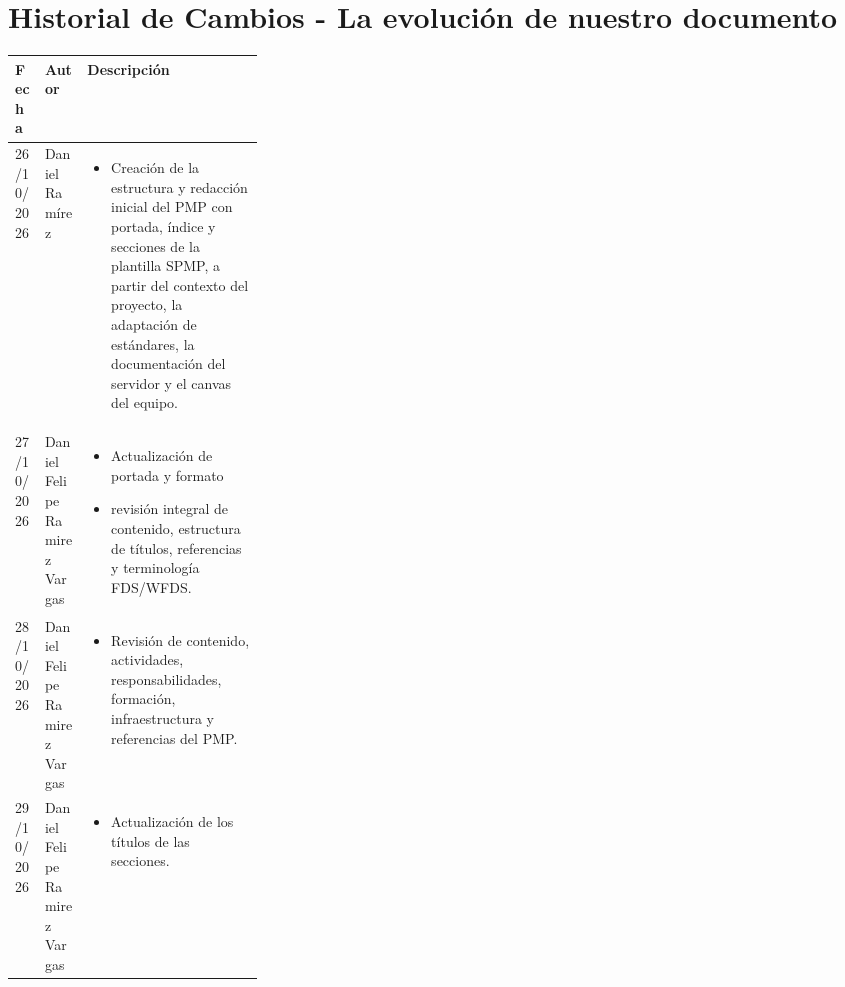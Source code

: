 \clearpage
\section{Historial de Cambios - La evolución de nuestro documento}\label{sec:spmp-1}
\begingroup\small\setlength{\tabcolsep}{5pt}\renewcommand{\arraystretch}{1.2}
\begin{longtable}{|p{0.12\linewidth}|p{0.17\linewidth}|p{}|}\hline
Fecha & Autor & Descripción\\[2mm]\hline
26/10/2026 & Daniel Ramírez & \vspace{-\baselineskip}\begin{itemize}\setlength{\itemsep}{0pt}\setlength{\parskip}{0pt}\setlength{\topsep}{0pt} \item Creación de la estructura y redacción inicial del PMP con portada, índice y secciones de la plantilla SPMP, a partir del contexto del proyecto, la adaptación de estándares, la documentación del servidor y el canvas del equipo.\end{itemize}\\\hline
27/10/2026 & Daniel Felipe Ramirez Vargas & \vspace{-\baselineskip}\begin{itemize}\setlength{\itemsep}{0pt}\setlength{\parskip}{0pt}\setlength{\topsep}{0pt} \item Actualización de portada y formato \item revisión integral de contenido, estructura de títulos, referencias y terminología FDS/WFDS.\end{itemize}\\\hline
28/10/2026 & Daniel Felipe Ramirez Vargas & \vspace{-\baselineskip}\begin{itemize}\setlength{\itemsep}{0pt}\setlength{\parskip}{0pt}\setlength{\topsep}{0pt} \item Revisión de contenido, actividades, responsabilidades, formación, infraestructura y referencias del PMP.\end{itemize}\\\hline
29/10/2026 & Daniel Felipe Ramirez Vargas & \vspace{-\baselineskip}\begin{itemize}\setlength{\itemsep}{0pt}\setlength{\parskip}{0pt}\setlength{\topsep}{0pt} \item Actualización de los títulos de las secciones.\end{itemize}\\\hline

\end{longtable}
